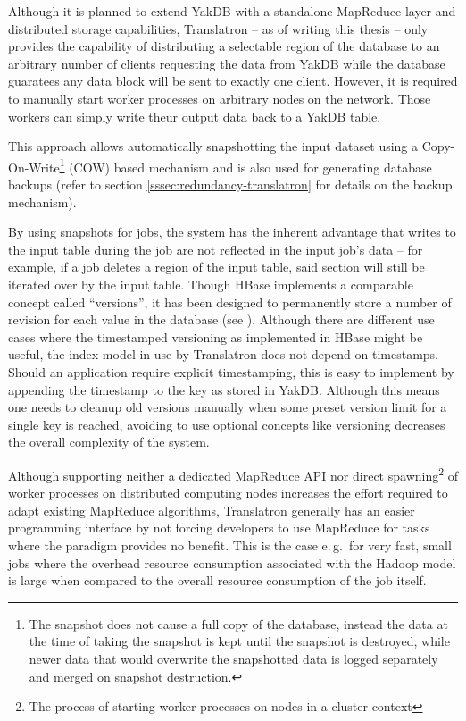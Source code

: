 \documentclass[a4paper, 12pt, twoside, reqn]{report}
\numberwithin{figure}{chapter}
\newtheorem[L]{boxedDefinition}{Definition}
\newtheorem[L]{boxedExample}{Example}
\newcommand{\eg}{e.\,g.\ }
\begin{document}
Although it is planned to extend YakDB with a standalone MapReduce layer and distributed storage capabilities, Translatron -- as of writing this thesis -- only provides the capability of distributing a selectable region of the database to an arbitrary number of clients requesting the data from YakDB while the database guaratees any data block will be sent to exactly one client. However, it is required to manually start worker processes on arbitrary nodes on the network. Those workers can simply write theur output data back to a YakDB table.

This approach allows automatically snapshotting the input dataset using a Copy-On-Write\footnote{The snapshot does not cause a full copy of the database, instead the data at the time of taking the snapshot is kept until the snapshot is destroyed, while newer data that would overwrite the snapshotted data is logged separately and merged on snapshot destruction.} (COW) based mechanism and is also used for generating database backups (refer to section \ref{sssec:redundancy-translatron} for details on the backup mechanism).

By using snapshots for jobs, the system has the inherent advantage that writes to the input table during the job are not reflected in the input job's data -- for example, if a job deletes a region of the input table, said section will still be iterated over by the input table. Though HBase implements a comparable concept called ``versions'', it has been designed to permanently store a number of revision for each value in the database (see \cite[chapter 9]{george2011hbase}). Although there are different use cases where the timestamped versioning as implemented in HBase might be useful, the index model in use by Translatron does not depend on timestamps. Should an application require explicit timestamping, this is easy to implement by appending the timestamp to the key as stored in YakDB. Although this means one needs to cleanup old versions manually when some preset version limit for a single key is reached, avoiding to use optional concepts like versioning decreases the overall complexity of the system.

Although supporting neither a dedicated MapReduce API nor direct spawning\footnote{The process of starting worker processes on nodes in a cluster context} of worker processes on distributed computing nodes increases the effort required to adapt existing MapReduce algorithms, Translatron generally has an easier programming interface by not forcing developers to use MapReduce for tasks where the paradigm provides no benefit. This is the case \eg for very fast, small jobs where the overhead resource consumption associated with the Hadoop model is large when compared to the overall resource consumption of the job itself.
\end{document}
